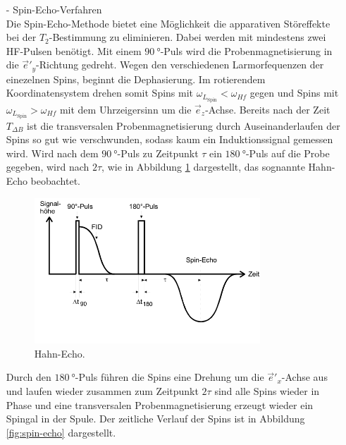 \begin{itemize}
  \item[-] Spin-Echo-Verfahren\\
  Die Spin-Echo-Methode bietet eine Möglichkeit die apparativen Störeffekte
  bei der $T_2$-Bestimmung zu eliminieren.
  Dabei werden mit mindestens zwei HF-Pulsen benötigt.
  Mit einem $\SI{90}{\degree}$-Puls wird die Probenmagnetisierung in die
$\vec{e}'_y$-Richtung gedreht.
Wegen den verschiedenen Larmorfequenzen der einezelnen Spins, beginnt die Dephasierung.
Im rotierendem Koordinatensystem drehen somit Spins mit $\omega_{L_\text{Spin}}<\omega_{Hf}$
gegen und Spins mit $\omega_{L_\text{Spin}}>\omega_{Hf}$ mit dem
Uhrzeigersinn um die $\vec{e}_z$-Achse.
Bereits nach der Zeit $T_{\Delta B}$ ist die transversalen
Probenmagnetisierung durch
Auseinanderlaufen der Spins so gut wie verschwunden,
sodass kaum ein Induktionssignal
gemessen wird. Wird nach dem $\SI{90}{\degree}$-Puls
zu Zeitpunkt $\tau$
ein $\SI{180}{\degree}$-Puls
auf die Probe gegeben, wird nach $2\tau$, wie in Abbildung \ref{fig:hahn-echo} dargestellt, das sognannte Hahn-Echo beobachtet.
\begin{figure}
  \includegraphics[width=0.8\textwidth]{hahn-echo.PNG}
  \caption{Hahn-Echo.}
  \label{fig:hahn-echo}
\end{figure}
Durch den $\SI{180}{\degree}$-Puls führen
die Spins eine Drehung um die
$\vec{e}'_x$-Achse aus und laufen wieder zusammen
zum Zeitpunkt $2\tau$ sind alle Spins wieder in Phase und eine
transversalen Probenmagnetisierung
erzeugt wieder ein Spingal in der Spule.
Der zeitliche Verlauf der Spins ist in Abbildung
\ref{fig:spin-echo} dargestellt.


\end{itemize}
